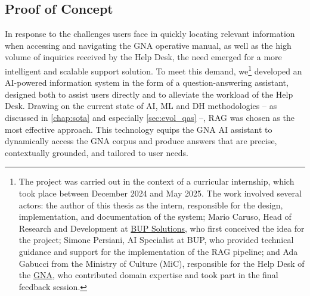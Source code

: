 \begin{spacing}{1.5}
\section{Proof of Concept}
In response to the challenges users face in quickly locating relevant information when accessing and navigating the GNA operative manual, as well as the high volume of inquiries received by the Help Desk, the need emerged for a more intelligent and scalable support solution. To meet this demand, we\footnote{The project was carried out in the context of a curricular internship, which took place between December 2024 and May 2025. The work involved several actors: the author of this thesis as the intern, responsible for the design, implementation, and documentation of the system; Mario Caruso, Head of Research and Development at \href{https://www.bupsolutions.com/en/home_en/}{BUP Solutions},\nocite{https://www.bupsolutions.com/en/home_en/} who first conceived the idea for the project; Simone Persiani, AI Specialist at BUP, who provided technical guidance and support for the implementation of the RAG pipeline; and Ada Gabucci from the Ministry of Culture (MiC), responsible for the Help Desk of the \href{https://gna.cultura.gov.it}{GNA}, who contributed domain expertise and took part in the final feedback session.} developed an AI-powered information system in the form of a question-answering assistant, designed both to assist users directly and to alleviate the workload of the Help Desk. Drawing on the current state of AI, ML and DH methodologies -- as discussed in \autoref{chap:sota} and especially \autoref{sec:evol_qas} --, RAG was chosen as the most effective approach. This technology equips the GNA AI assistant to dynamically access the GNA corpus and produce answers that are precise, contextually grounded, and tailored to user needs.


\end{spacing}
